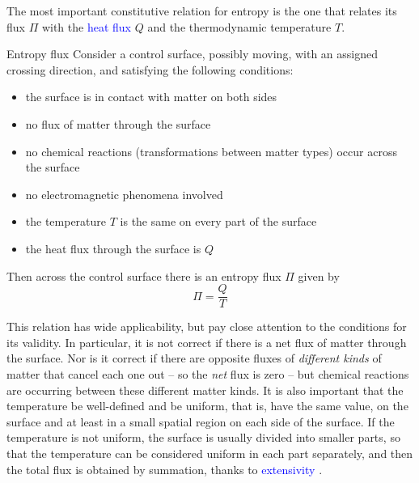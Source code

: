 \documentclass[a4paper,12pt,%
onecolumn,oneside,%
british%
]{memoir}
\renewcommand*{\|}[1][]{\nonscript\:#1\vert\nonscript\:\mathopen{}}
\newcommand*{\sect}{\S}%
\renewcommand*{\autoref}[3][\sect\,\ref]{\textcolor{blue}{#3}
\raisebox{0.6ex}{\color{blue}\miniscule%
\faIcon{angle-right}%
\;#1{#2}\;p.\,\pageref{#2}}}
\newcommand*{\yQ}{Q}%
\newcommand*{\yB}{\varPi}
\newcommand*{\yT}{T}%
\begin{document}
The most important constitutive relation for entropy is the one that relates its flux $\yB$ with the \autoref{sec:heating_power}{heat flux} $\yQ$ and the thermodynamic temperature $\yT$.
\begin{definition}{Entropy flux}\label{def:entropyflux}
  Consider a control surface, possibly moving, with an assigned crossing direction, and satisfying the following conditions:
  \begin{itemize}[nosep]
  \item the surface is in contact with matter on both sides
  \item no flux of matter through the surface
  \item no chemical reactions (transformations between matter types) occur across the surface
  \item no electromagnetic phenomena involved
  \item the temperature $\yT$ is the same on every part of the surface
  \item the heat flux through the surface is $\yQ$
  \end{itemize}

\medskip

  Then across the control surface there is an entropy flux $\yB$ given by
  \begin{equation}
    \label{eq:entropy_flux}
    \yB = \frac{\yQ}{\yT}
  \end{equation}
\end{definition}
This relation has wide applicability, but pay close attention to the conditions for its validity. In particular, it is not correct if there is a net flux of matter through the surface. Nor is it correct if there are opposite fluxes of \emph{different kinds} of matter that cancel each one out -- so the \emph{net} flux is zero -- but chemical reactions are occurring between these different matter kinds. It is also important that the temperature be well-defined and be uniform, that is, have the same value, on the surface and at least in a small spatial region on each side of the surface. If the temperature is not uniform, the surface is usually divided into smaller parts, so that the temperature can be considered uniform in each part separately, and then the total flux is obtained by summation, thanks to \autoref{def:extensivity}{extensivity}.
\end{document}
